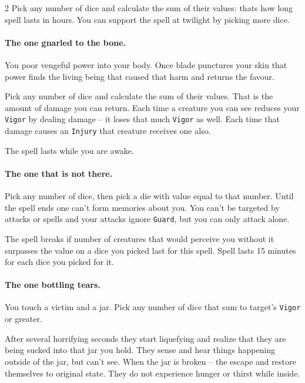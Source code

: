 \begin{multicols*}{2}
Pick any number of dice and calculate the sum of their values: thats how long spell lasts in hours. 
You can support the spell at twilight by picking more dice.

\paragraph{The one gnarled to the bone.} You poor vengeful power into your body. 
Once blade punctures your skin that power finds the living being that caused that harm and returns the favour.

Pick any number of dice and calculate the sum of their values. That is the amount of damage you can return. 
Each time a creature you can see reduces your \texttt{Vigor} by dealing damage -- it loses that much \texttt{Vigor} as well.
Each time that damage causes an \texttt{Injury} that creature receives one also.

The spell lasts while you are awake. 

\paragraph{The one that is not there.} Pick any number of dice, then pick a die with value equal to that number. 
Until the spell ends one can't form memories about you. 
You can't be targeted by attacks or spells and your attacks ignore \texttt{Guard}, but you can only attack alone.

The spell breaks if number of creatures that would perceive you without it surpasses the value on a dice you picked last for this spell. 
Spell lasts 15 minutes for each dice you picked for it.

\paragraph{The one bottling tears.} You touch a victim and a jar. Pick any number of dice that sum to target's \texttt{Vigor} or greater. 

After several horrifying seconds they start liquefying and realize that they are being sucked into that jar you hold.
They sense and hear things happening outside of the jar, but can't see. When the jar is broken -- the escape and restore themselves to original state. 
They do not experience hunger or thirst while inside.


\end{multicols*}
